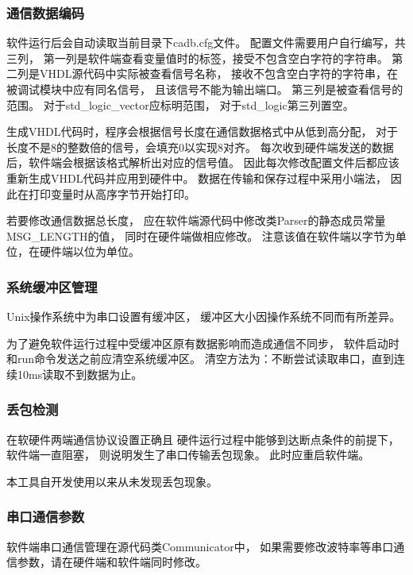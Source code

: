         \subsubsection{通信数据编码}
            软件运行后会自动读取当前目录下cadb.cfg文件。%
            配置文件需要用户自行编写，共三列，%
            第一列是软件端查看变量值时的标签，接受不包含空白字符的字符串。
            第二列是VHDL源代码中实际被查看信号名称，%
            接收不包含空白字符的字符串，在被调试模块中应有同名信号，%
            且该信号不能为输出端口。
            第三列是被查看信号的范围。%
            对于std\_logic\_vector应标明范围，%
            对于std\_logic第三列置空。

            生成VHDL代码时，程序会根据信号长度在通信数据格式中从低到高分配，%
            对于长度不是8的整数倍的信号，会填充0以实现8对齐。%
            每次收到硬件端发送的数据后，软件端会根据该格式解析出对应的信号值。%
            因此每次修改配置文件后都应该重新生成VHDL代码并应用到硬件中。%
            数据在传输和保存过程中采用小端法，%
            因此在打印变量时从高序字节开始打印。

            若要修改通信数据总长度，%
            应在软件端源代码中修改类Parser的静态成员常量MSG\_LENGTH的值，%
            同时在硬件端做相应修改。%
            注意该值在软件端以字节为单位，在硬件端以位为单位。

        \subsubsection{系统缓冲区管理}
            Unix操作系统中为串口设置有缓冲区，%
            缓冲区大小因操作系统不同而有所差异。%

            为了避免软件运行过程中受缓冲区原有数据影响而造成通信不同步，%
            软件启动时和run命令发送之前应清空系统缓冲区。%
            清空方法为：不断尝试读取串口，直到连续10ms读取不到数据为止。

        \subsubsection{丢包检测}
            在软硬件两端通信协议设置正确且%
            硬件运行过程中能够到达断点条件的前提下，软件端一直阻塞，%
            则说明发生了串口传输丢包现象。%
            此时应重启软件端。

            本工具自开发使用以来从未发现丢包现象。
        \subsubsection{串口通信参数}
            软件端串口通信管理在源代码类Communicator中，%
            如果需要修改波特率等串口通信参数，请在硬件端和软件端同时修改。
        
